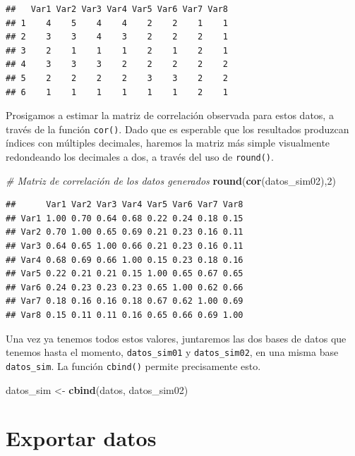 \documentclass[
]{book}
\newenvironment{Shaded}{\begin{snugshade}}{\end{snugshade}}
\newcommand{\CommentTok}[1]{\textcolor[rgb]{0.56,0.35,0.01}{\textit{#1}}}
\newcommand{\DecValTok}[1]{\textcolor[rgb]{0.00,0.00,0.81}{#1}}
\newcommand{\FunctionTok}[1]{\textcolor[rgb]{0.13,0.29,0.53}{\textbf{#1}}}
\newcommand{\NormalTok}[1]{#1}
\newcommand{\OtherTok}[1]{\textcolor[rgb]{0.56,0.35,0.01}{#1}}
\begin{document}
\begin{verbatim}
##   Var1 Var2 Var3 Var4 Var5 Var6 Var7 Var8
## 1    4    5    4    4    2    2    1    1
## 2    3    3    4    3    2    2    2    1
## 3    2    1    1    1    2    1    2    1
## 4    3    3    3    2    2    2    2    2
## 5    2    2    2    2    3    3    2    2
## 6    1    1    1    1    1    1    2    1
\end{verbatim}

Prosigamos a estimar la matriz de correlación observada para estos datos, a través de la función \texttt{cor()}. Dado que es esperable que los resultados produzcan índices con múltiples decimales, haremos la matriz más simple visualmente redondeando los decimales a dos, a través del uso de \texttt{round()}.

\begin{Shaded}
\begin{Highlighting}[]
\CommentTok{\# Matriz de correlación de los datos generados}
\FunctionTok{round}\NormalTok{(}\FunctionTok{cor}\NormalTok{(datos\_sim02),}\DecValTok{2}\NormalTok{)}
\end{Highlighting}
\end{Shaded}

\begin{verbatim}
##      Var1 Var2 Var3 Var4 Var5 Var6 Var7 Var8
## Var1 1.00 0.70 0.64 0.68 0.22 0.24 0.18 0.15
## Var2 0.70 1.00 0.65 0.69 0.21 0.23 0.16 0.11
## Var3 0.64 0.65 1.00 0.66 0.21 0.23 0.16 0.11
## Var4 0.68 0.69 0.66 1.00 0.15 0.23 0.18 0.16
## Var5 0.22 0.21 0.21 0.15 1.00 0.65 0.67 0.65
## Var6 0.24 0.23 0.23 0.23 0.65 1.00 0.62 0.66
## Var7 0.18 0.16 0.16 0.18 0.67 0.62 1.00 0.69
## Var8 0.15 0.11 0.11 0.16 0.65 0.66 0.69 1.00
\end{verbatim}

Una vez ya tenemos todos estos valores, juntaremos las dos bases de datos que tenemos hasta el momento, \texttt{datos\_sim01} y \texttt{datos\_sim02}, en una misma base \texttt{datos\_sim}. La función \texttt{cbind()} permite precisamente esto.

\begin{Shaded}
\begin{Highlighting}[]
\NormalTok{datos\_sim }\OtherTok{\textless{}{-}} \FunctionTok{cbind}\NormalTok{(datos, datos\_sim02)  }
\end{Highlighting}
\end{Shaded}

\hypertarget{exportar-datos}{%
\section{Exportar datos}\label{exportar-datos}}
\end{document}
